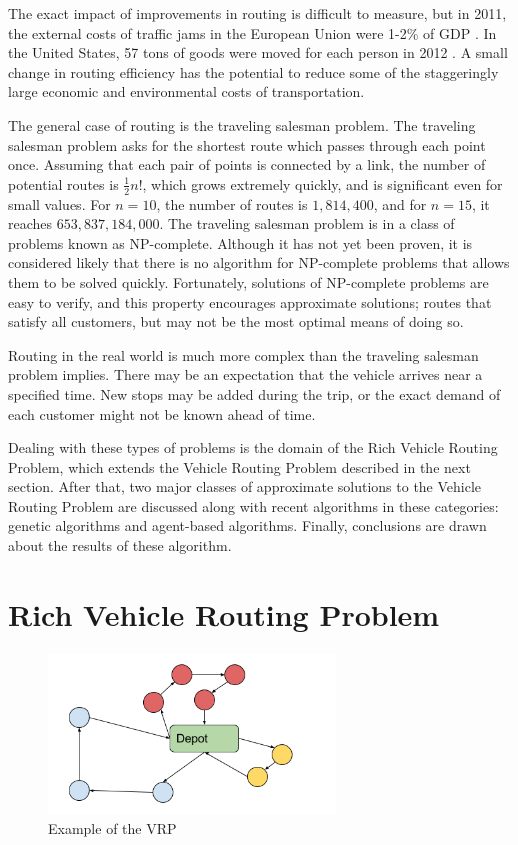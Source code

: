 \documentclass{sig-alternate}
\begin{document}
The exact impact of improvements in routing is difficult to measure, but in 2011, the external costs of traffic jams in the European Union were 1-2\% of GDP \cite{Caceres-Cruz:2014}. In the United States, 57 tons of goods were moved for each person in 2012 \cite{BOTS:2012}. A small change in routing efficiency has the potential to reduce some of the staggeringly large economic and environmental costs of transportation.

The general case of routing is the traveling salesman problem. The traveling salesman problem asks for the shortest route which passes through each point once. Assuming that each pair of points is connected by a link, the number of potential routes is $\tfrac{1}{2}n!$, which grows extremely quickly, and is significant even for small values. For $n=10$, the number of routes is $1,814,400$, and for $n=15$, it reaches $653,837,184,000$. The traveling salesman problem is in a class of problems known as NP-complete. Although it has not yet been proven, it is considered likely that there is no algorithm for NP-complete problems that allows them to be solved quickly. Fortunately, solutions of NP-complete problems are easy to verify, and this property encourages approximate solutions; routes that satisfy all customers, but may not be the most optimal means of doing so. 

Routing in the real world is much more complex than the traveling salesman problem implies. There may be an expectation that the vehicle arrives near a specified time. New stops may be added during the trip, or the exact demand of each customer might not be known ahead of time.

Dealing with these types of problems is the domain of the Rich Vehicle Routing Problem, which extends the Vehicle Routing Problem described in the next section. After that, two major classes of approximate solutions to the Vehicle Routing Problem are discussed along with recent algorithms in these categories: genetic algorithms and agent-based algorithms. Finally, conclusions are drawn about the results of these algorithm.

\section{Rich Vehicle Routing Problem}
\label{sec:VRP}

\begin{figure}
\centering
\includegraphics[width=3in, keepaspectratio]{VRP.png}
\caption{Example of the VRP}
\label{fig:VRPgraph}
\end{figure}
\end{document}
